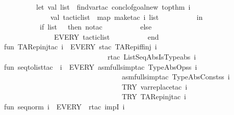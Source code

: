 \begin{isabellebody}
\ \ \ \ \ \ \ \ \ let\ val\ list\ {\isacharequal}\ {\isacharparenleft}find{\isacharunderscore}var{\isacharunderscore}tac\ {\isacharparenleft}concl{\isacharunderscore}of{\isacharunderscore}goal{\isacharunderscore}new\ {\isacharparenleft}topthm{\isacharparenleft}{\isacharparenright}{\isacharparenright}\ i{\isacharparenright}{\isacharparenright}\isanewline
\ \ \ \ \ \ \ \ \ \ \ \ \ val\ tactic{\isacharunderscore}list\ {\isacharequal}\ {\isacharparenleft}map\ {\isacharparenleft}make{\isacharunderscore}tac\ i{\isacharparenright}\ list{\isacharparenright}\isanewline
\ \ \ \ \ \ \ \ \ \ in\isanewline
\ \ \ \ \ \ \ \ \ \ if\ {\isacharparenleft}list\ {\isacharequal}\ {\isacharbrackleft}{\isacharbrackright}{\isacharparenright}\ then\ no{\isacharunderscore}tac\isanewline
\ \ \ \ \ \ \ \ \ \ else\ \isanewline
\ \ \ \ \ \ \ \ \ \ \ \ \ \ EVERY\ tactic{\isacharunderscore}list\isanewline
\ \ \ \ \ \ \ \ \ \ end{\isacharparenright}{\isacharparenright}\isanewline
{\isacharverbatimclose}\isanewline
\isanewline
{}\isamarkupfalse%
\isanewline
{\isacharverbatimopen}\isanewline
fun\ TARep{\isacharunderscore}inj{\isacharunderscore}tac\ i\ {\isacharequal}\ EVERY\ {\isacharbrackleft}{\isacharparenleft}stac\ TARep{\isacharunderscore}iff{\isacharunderscore}inj\ i{\isacharparenright}{\isacharcomma}\isanewline
\ \ \ \ \ \ \ \ \ \ \ \ \ \ \ \ \ \ \ \ \ \ \ \ \ \ \ \ \ {\isacharparenleft}rtac\ ListSeqAbsIsTypeabs\ i{\isacharparenright}{\isacharbrackright}\isanewline
\ \ \ \ \ \ \ \ \ \ \ \ \ \ \ \isanewline
fun\ seq{\isacharunderscore}to{\isacharunderscore}list{\isacharunderscore}tac\ \ i\ {\isacharequal}\ {\isacharparenleft}EVERY\ {\isacharbrackleft}{\isacharparenleft}asm{\isacharunderscore}full{\isacharunderscore}simp{\isacharunderscore}tac\ TypeAbs{\isacharunderscore}Op{\isacharunderscore}ss\ i{\isacharparenright}{\isacharcomma}\isanewline
\ \ \ \ \ \ \ \ \ \ \ \ \ \ \ \ \ \ \ \ \ \ \ \ \ \ \ \ \ \ \ \ \ {\isacharparenleft}asm{\isacharunderscore}full{\isacharunderscore}simp{\isacharunderscore}tac\ TypeAbs{\isacharunderscore}Const{\isacharunderscore}ss\ i{\isacharparenright}{\isacharcomma}\isanewline
\ \ \ \ \ \ \ \ \ \ \ \ \ \ \ \ \ \ \ \ \ \ \ \ \ \ \ \ \ \ \ \ \ TRY\ {\isacharparenleft}var{\isacharunderscore}replace{\isacharunderscore}tac\ i{\isacharparenright}{\isacharcomma}\isanewline
\ \ \ \ \ \ \ \ \ \ \ \ \ \ \ \ \ \ \ \ \ \ \ \ \ \ \ \ \ \ \ \ \ TRY\ {\isacharparenleft}TARep{\isacharunderscore}inj{\isacharunderscore}tac\ i{\isacharparenright}{\isacharbrackright}{\isacharparenright}\isanewline
\isanewline
fun\ seq{\isacharunderscore}norm\ i\ {\isacharequal}\ EVERY\ {\isacharbrackleft}\ {\isacharparenleft}rtac\ impI\ i{\isacharparenright}{\isacharcomma}\isanewline

\end{isabellebody}
